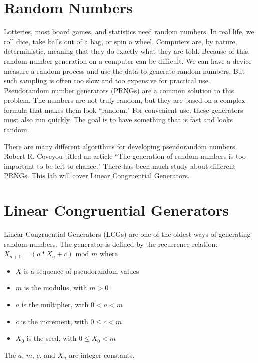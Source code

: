 \label{lab:PRNG}


\section*{Random Numbers}
Lotteries, most board games, and statistics need random numbers.
In real life, we roll dice, take balls out of a bag, or spin a wheel.
Computers are, by nature, deterministic, meaning that they do exactly what they are told.
Because of this, random number generation on a computer can be difficult.
We can have a device measure a random process and use the data to generate random numbers, 
But such sampling is often too slow and too expensive for practical use.
Pseudorandom number generators (PRNGs) are a common solution to this problem.
The numbers are not truly random, but they are based on a complex formula that makes them look ``random."
For convenient use, these generators must also run quickly.
The goal is to have something that is fast and looks random.

There are many different algorithms for developing pseudorandom numbers.
Robert R. Coveyou titled an article ``The generation of random numbers is too important to be left to chance."
There has been much study about different PRNGs.
This lab will cover Linear Congruential Generators.

\section*{Linear Congruential Generators}
Linear Congruential Generators (LCGs) are one of the oldest ways of generating random numbers.
The generator is defined by the recurrence relation:
$X_{n+1}=(a*X_n + c)$ mod $m$ where

\begin{itemize}
\item $X$ is a sequence of pseudorandom values
\item $m$ is the modulus, with $m>0$
\item $a$ is the multiplier, with $0<a<m$
\item $c$ is the increment, with $0\leq c<m$
\item $X_0$ is the seed, with $0\leq X_0 <m$
\end{itemize}

The $a$, $m$, $c$, and $X_n$ are integer constants.

